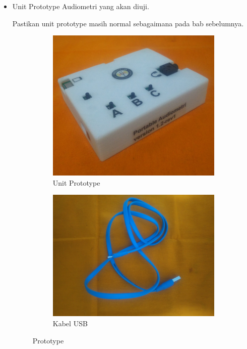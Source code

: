 \documentclass[12pt,]{article}
\begin{document}
	\begin{itemize}

		\item Unit Prototype Audiometri yang akan diuji.

		Pastikan unit prototype masih normal sebagaimana pada bab sebelumnya.

		\begin{figure}[!ht]
			\centering
			\begin{subfigure}[b]{0.3\textwidth}
				\includegraphics[width=\textwidth]{images/foto/unit}
				\caption{Unit Prototype}
			\end{subfigure}
			\begin{subfigure}[b]{0.3\textwidth}
				\includegraphics[width=\textwidth]{images/foto/kabel}
				\caption{Kabel USB}
			\end{subfigure}
			\caption{Prototype}
		\end{figure}



\end{itemize}
\end{document}
